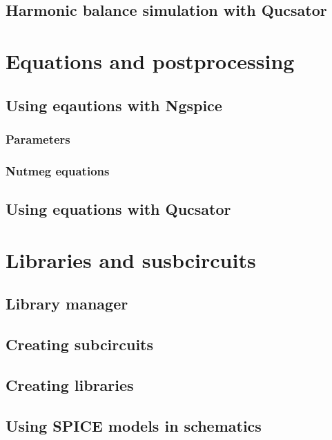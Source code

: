 \subsection{Harmonic balance simulation with Qucsator}

\section{Equations and postprocessing}

\subsection{Using eqautions with Ngspice}

\subsubsection{Parameters}

\subsubsection{Nutmeg equations}

\subsection{Using equations with Qucsator}

\section{Libraries and susbcircuits}

\subsection{Library manager}

\subsection{Creating subcircuits}

\subsection{Creating libraries}

\subsection{Using SPICE models in schematics}


